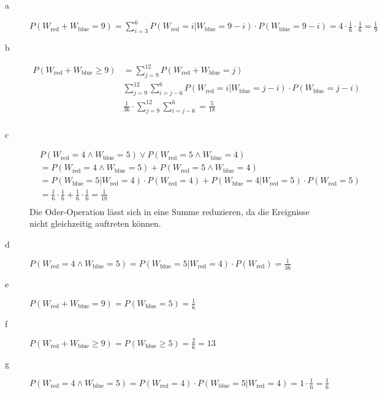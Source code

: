 

\begin{description}
    \item[a] $P(W_\text{red}+W_\text{blue}=9)=\sum_{i=3}^6P(W_\text{red}=i|W_\text{blue}=9-i)\cdot P(W_\text{blue}=9-i)
    =4 \cdot \frac{1}{6}\cdot \frac{1}{6}=\frac{1}{9}$
    \item[b] {\begin{align*}
            P(W_\text{red}+W_\text{blue}\geq 9)&=\sum_{j=9}^12P(W_\text{red}+W_\text{blue}=j)\\
            &\sum_{j=9}^12\sum_{i=j-6}^6P(W_\text{red}=i|W_\text{blue}=j-i)\cdot P(W_\text{blue}=j-i)\\
            &\frac{1}{36}\cdot \sum_{j=9}^12\sum_{i=j-6}^6=\frac{5}{18}\\
            \end{align*}}
    \item[c]\begin{align*}
            &P(W_\text{red}=4\wedge W_\text{blue}=5) \vee P(W_\text{red}=5\wedge W_\text{blue}=4)\\
            &=P(W_\text{red}=4\wedge W_\text{blue}=5)+P(W_\text{red}=5\wedge W_\text{blue}=4)\\
            &=P(W_\text{blue}=5|W_\text{red}=4)\cdot P(W_\text{red}=4)+P(W_\text{blue}=4|W_\text{red}=5)\cdot P(W_\text{red}=5)\\
            &= \frac{1}{6}\cdot \frac{1}{6}+\frac{1}{6}\cdot \frac{1}{6}=\frac{1}{18}\\
            \end{align*}
            Die Oder-Operation lässt sich in eine Summe reduzieren, da die Ereignisse nicht gleichzeitig auftreten können.
    \item[d]$P(W_\text{red}=4\wedge W_\text{blue}=5)=P(W_\text{blue}=5|W_\text{red}=4)\cdot P(W_\text{red})=\frac{1}{36}$
    \item[e]$P(W_\text{red}+W_\text{blue}=9)= P(W_\text{blue}= 5)=\frac{1}{6}$
    \item[f]$P(W_\text{red}+W_\text{blue}\geq 9) = P(W_\text{blue}\geq 5)=\frac{2}{6}={1}{3}$
    \item[g]$P(W_\text{red}=4\wedge W_\text{blue}=5)=P(W_\text{red}=4)\cdot P(W_\text{blue}=5|W_\text{red}=4)= 1\cdot \frac{1}{6}=\frac{1}{6}$    
\end{description}
